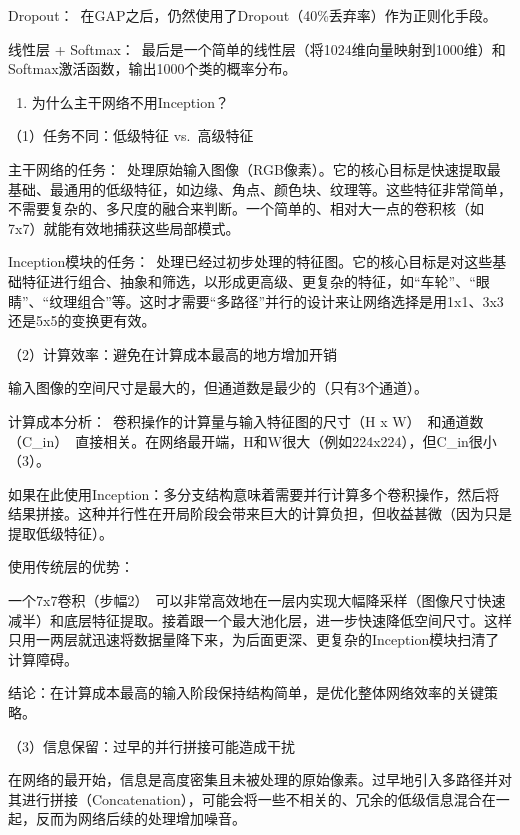 Dropout：~在GAP之后，仍然使用了Dropout（40\%丢弃率）作为正则化手段。

线性层 + Softmax：~最后是一个简单的线性层（将1024维向量映射到1000维）和Softmax激活函数，输出1000个类的概率分布。

\begin{enumerate}
\def\labelenumi{\arabic{enumi}.}
\setcounter{enumi}{4}
\tightlist
\item
  为什么主干网络不用Inception？
\end{enumerate}

（1）任务不同：低级特征 vs.~高级特征

主干网络的任务：~处理原始输入图像（RGB像素）。它的核心目标是快速提取最基础、最通用的低级特征，如边缘、角点、颜色块、纹理等。这些特征非常简单，不需要复杂的、多尺度的融合来判断。一个简单的、相对大一点的卷积核（如7x7）就能有效地捕获这些局部模式。

Inception模块的任务：~处理已经过初步处理的特征图。它的核心目标是对这些基础特征进行组合、抽象和筛选，以形成更高级、更复杂的特征，如``车轮''、``眼睛''、``纹理组合''等。这时才需要``多路径''并行的设计来让网络选择是用1x1、3x3还是5x5的变换更有效。

（2）计算效率：避免在计算成本最高的地方增加开销

输入图像的空间尺寸是最大的，但通道数是最少的（只有3个通道）。

计算成本分析：~卷积操作的计算量与输入特征图的尺寸（H x W）~和通道数（C\_in）~直接相关。在网络最开端，H和W很大（例如224x224），但C\_in很小（3）。

如果在此使用Inception：多分支结构意味着需要并行计算多个卷积操作，然后将结果拼接。这种并行性在开局阶段会带来巨大的计算负担，但收益甚微（因为只是提取低级特征）。

使用传统层的优势：

一个7x7卷积（步幅2）~可以非常高效地在一层内实现大幅降采样（图像尺寸快速减半）和底层特征提取。接着跟一个最大池化层，进一步快速降低空间尺寸。这样只用一两层就迅速将数据量降下来，为后面更深、更复杂的Inception模块扫清了计算障碍。

结论：在计算成本最高的输入阶段保持结构简单，是优化整体网络效率的关键策略。

（3）信息保留：过早的并行拼接可能造成干扰

在网络的最开始，信息是高度密集且未被处理的原始像素。过早地引入多路径并对其进行拼接（Concatenation），可能会将一些不相关的、冗余的低级信息混合在一起，反而为网络后续的处理增加噪音。

